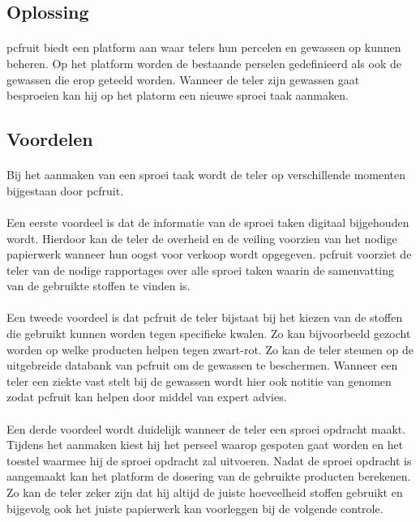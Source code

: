 \subsection {Oplossing}

\paragraph {} pcfruit biedt een platform aan waar telers hun percelen en gewassen op
kunnen beheren. Op het platform worden de bestaande perselen gedefinieerd als ook de
gewassen die erop geteeld worden. Wanneer de teler zijn gewassen gaat besproeien kan hij
op het platorm een nieuwe sproei taak aanmaken.


\subsection {Voordelen}

\paragraph {} Bij het aanmaken van een sproei taak wordt de teler op verschillende
momenten bijgestaan door pcfruit.

\paragraph {} Een eerste voordeel is dat de informatie van de sproei taken digitaal
bijgehouden wordt.  Hierdoor kan de teler de overheid en de veiling voorzien van het
nodige papierwerk wanneer hun oogst voor verkoop wordt opgegeven. pcfruit voorziet de
teler van de nodige rapportages over alle sproei taken waarin de samenvatting van de
gebruikte stoffen te vinden is.

\paragraph {} Een tweede voordeel is dat pcfruit de teler bijstaat bij het kiezen van de
stoffen die gebruikt kunnen worden tegen specifieke kwalen. Zo kan bijvoorbeeld gezocht
worden op welke producten helpen tegen zwart-rot. Zo kan de teler steunen op de
uitgebreide databank van pcfruit om de gewassen te beschermen. Wanneer een teler een
ziekte vast stelt bij de gewassen wordt hier ook notitie van genomen zodat pcfruit kan
helpen door middel van expert advies.

\paragraph {} Een derde voordeel wordt duidelijk wanneer de teler een sproei opdracht
maakt. Tijdens het aanmaken kiest hij het perseel waarop gespoten gaat worden en het
toestel waarmee hij de sproei opdracht zal uitvoeren. Nadat de sproei opdracht is
aangemaakt kan het platform de dosering van de gebruikte producten berekenen. Zo kan de
teler zeker zijn dat hij altijd de juiste hoeveelheid stoffen gebruikt en bijgevolg ook
het juiste papierwerk kan voorleggen bij de volgende controle.


